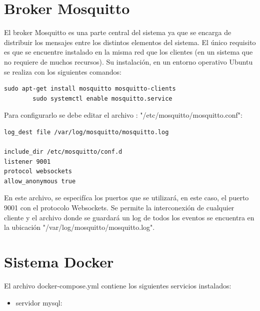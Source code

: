 		
		
\section{Broker Mosquitto}

El broker Mosquitto es una parte central del sistema ya que se encarga de distribuir los mensajes entre los distintos elementos del sistema. El único requisito es que se encuentre instalado en la misma red que los clientes (en un sistema que no requiere de muchos recursos). Su instalación, en un entorno operativo Ubuntu se realiza con los siguientes comandos:




\begin{lstlisting}[caption=  Instalación/lanzamiento del broker Mosquitto]
		sudo apt-get install mosquitto mosquitto-clients
		sudo systemctl enable mosquitto.service
\end{lstlisting}

Para configurarlo se debe editar el archivo : "/etc/mosquitto/mosquitto.conf":

\begin{lstlisting}[caption=  Contenido archivo mosquitto.conf]
log_dest file /var/log/mosquitto/mosquitto.log

include_dir /etc/mosquitto/conf.d
listener 9001
protocol websockets
allow_anonymous true

\end{lstlisting}

En este archivo, se especifíca los puertos que se utilizará, en este caso, el puerto 9001 con el protocolo Websockets. Se permite la interconexión de cualquier cliente y el archivo donde se guardará un log de todos los eventos se encuentra en la ubicación "/var/log/mosquitto/mosquitto.log".

\pagebreak
\section{Sistema Docker}

El archivo docker-compose.yml contiene los siguientes servicios instalados:

\begin{itemize}
\item servidor mysql:




\end{itemize}




